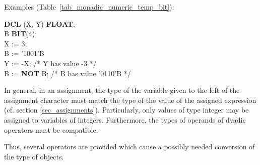 Examples (Table~\ref{tab_monadic_numeric_temp_bit}):

\begin{tabbing}
{\bf DCL} (X, Y) \= {\bf FLOAT},  \= \\
\x        B      \> {\bf BIT}(4); \> \\
X := 3;            \> \> \\
B := '1001'B       \> \> \\
Y := -X;           \> \> /* Y has value -3 */\\
B := {\bf NOT} B;  \> \> /* B has value '0110'B */\\
\end{tabbing}

In general, in an assignment, the type of the variable given to the left
of the assignment character must match the type of the value of the
assigned expression (cf. section \ref{sec_assignments}).
 Particularly, only values of type
integer may be assigned to variables of integers. Furthermore, the types
of operands of dyadic operators must be compatible.

Thus, several operators are provided which cause a possibly needed
conversion of the type of objects.

